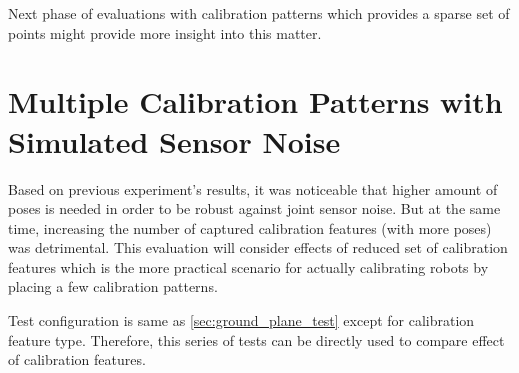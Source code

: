 \documentclass[english, printversion, nomenclature, notitle]{tuvisionthesis} %
\begin{document}
Next phase of evaluations with calibration patterns which provides a sparse set of points might provide more insight into this matter.

\section{Multiple Calibration Patterns with Simulated Sensor Noise}

Based on previous experiment's results, it was noticeable that higher amount of poses is needed in order to be robust against joint sensor noise. But at the same time, increasing the number of captured calibration features (with more poses) was detrimental. This evaluation will consider effects of reduced set of calibration features which is the more practical scenario for actually calibrating robots by placing a few calibration patterns.

Test configuration is same as \cref{sec:ground_plane_test} except for calibration feature type. Therefore, this series of tests can be directly used to compare effect of calibration features.

\begin{table}[]
	\caption[Results from testing with Charuco Patterns]{Results from testing with Charuco  calibration features on ground. The results depicts several trends between calibration pose count, type of induced noise and success/ failure statistics}
\end{table}
\end{document}
